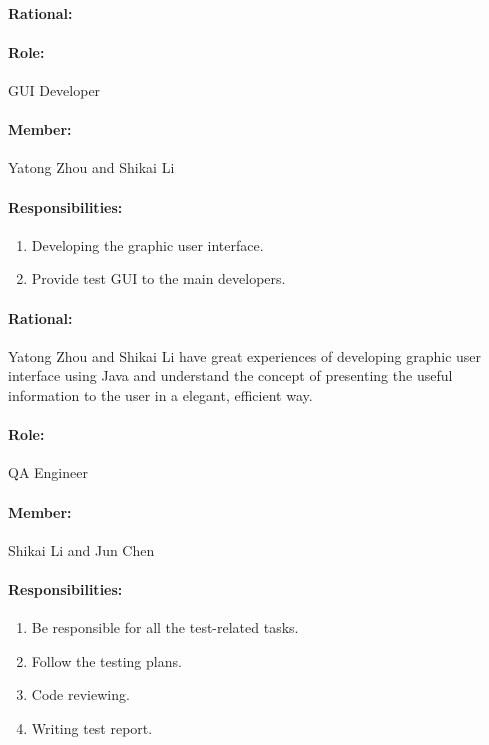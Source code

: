 \documentclass[11pt, a4paper]{report}
\begin{document}
\paragraph{Rational: \\}


\paragraph{Role: } GUI Developer
\paragraph{Member: } Yatong Zhou and Shikai Li
\paragraph{Responsibilities: }
\begin{enumerate}
	\item  Developing the graphic user interface.
	\item  Provide test GUI to the main developers.
\end{enumerate}
\paragraph{Rational: \\}
Yatong Zhou and Shikai Li have great experiences of developing graphic user interface using Java and understand the concept of presenting the useful information to the user in a elegant, efficient way.


\paragraph{Role: } QA Engineer
\paragraph{Member: } Shikai Li and Jun Chen
\paragraph{Responsibilities: }
\begin{enumerate}
	\item  Be responsible for all the test-related tasks.
	\item  Follow the testing plans.
	\item  Code reviewing.
	\item  Writing test report.
\end{enumerate}
\end{document}
